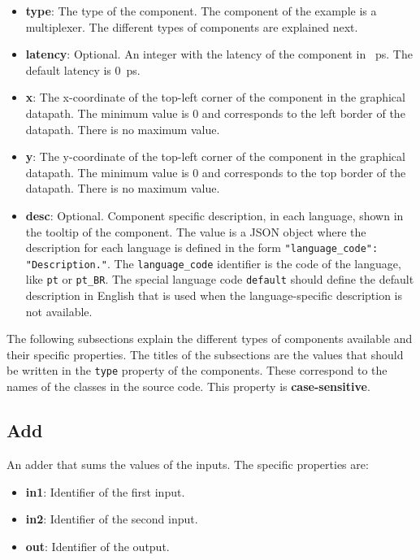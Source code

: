 \documentclass[11pt,a4paper,twoside,titlepage]{report}
\begin{document}
\begin{itemize}
	\item \textbf{type}: The type of the component. The component of the example
		is a multiplexer. The different types of components are explained next.
	\item \textbf{latency}: Optional. An integer with the latency of the component
		in \SI{}{\pico\second}. The default latency is \SI{0}{\pico\second}.
	\item \textbf{x}: The x-coordinate of the top-left corner of the component in 
		the graphical datapath. The minimum value is 0 and corresponds to the left
		border of the datapath. There is no maximum value.
	\item \textbf{y}: The y-coordinate of the top-left corner of the component in 
		the graphical datapath. The minimum value is 0 and corresponds to the top
		border of the datapath. There is no maximum value.
	\item \textbf{desc}: Optional. Component specific description, in each language, 
		shown in the tooltip of the component.
		The value is a JSON object where the description for each language is defined
		in the form \verb+"language_code": "Description."+. The \verb+language_code+
		identifier is the code of the language, like \verb+pt+ or \verb+pt_BR+.
		The special language code \verb+default+ should define the default description
		in English that is used when the language-specific description is not available.
\end{itemize}

The following subsections explain the different types of components available
and their specific properties. 
The titles of the subsections are the values that should be written in the
\verb+type+ property of the components. These correspond to the names of the classes
in the source code. This property is \textbf{case-sensitive}.

\subsection{Add}

An adder that sums the values of the inputs. The specific properties are:
\begin{itemize}
	\item \textbf{in1}: Identifier of the first input.
	\item \textbf{in2}: Identifier of the second input.
	\item \textbf{out}: Identifier of the output.
\end{itemize}
\end{document}
